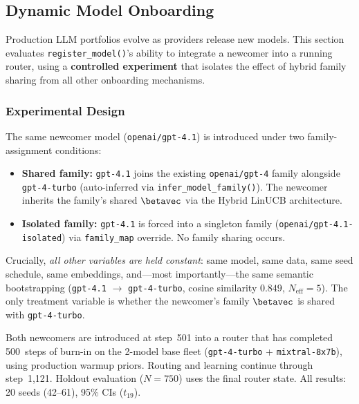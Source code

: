 
\subsection{Dynamic Model Onboarding}
\label{appendix:model_onboarding}

Production LLM portfolios evolve as providers release new models.
This section evaluates \texttt{register\_model()}'s ability to integrate a
newcomer into a running router, using a \textbf{controlled experiment}
that isolates the effect of hybrid family sharing from all other
onboarding mechanisms.

\subsubsection{Experimental Design}

The same newcomer model (\texttt{openai/gpt-4.1}) is introduced under
two family-assignment conditions:

\begin{itemize}[nosep]
    \item \textbf{Shared family:} \texttt{gpt-4.1} joins the existing
          \texttt{openai/gpt-4} family alongside \texttt{gpt-4-turbo}
          (auto-inferred via \texttt{infer\_model\_family()}).
          The newcomer inherits the family's shared $\betavec$ via
          the Hybrid LinUCB architecture.
    \item \textbf{Isolated family:} \texttt{gpt-4.1} is forced into a
          singleton family (\texttt{openai/gpt-4.1-isolated}) via
          \texttt{family\_map} override.  No family sharing occurs.
\end{itemize}

\noindent Crucially, \emph{all other variables are held constant}:
same model, same data, same seed schedule, same embeddings, and---most
importantly---the same semantic bootstrapping
(\texttt{gpt-4.1} $\to$ \texttt{gpt-4-turbo}, cosine similarity $0.849$,
$N_{\text{eff}}{=}5$).  The only treatment variable is whether the
newcomer's family $\betavec$ is shared with \texttt{gpt-4-turbo}.

Both newcomers are introduced at step~501 into a router that has
completed 500~steps of burn-in on the 2-model base fleet
(\texttt{gpt-4-turbo} + \texttt{mixtral-8x7b}), using production
warmup priors.  Routing and learning continue through step~1,121.
Holdout evaluation ($N{=}750$) uses the final router state.
All results: 20 seeds (42--61), 95\% CIs ($t_{19}$).

